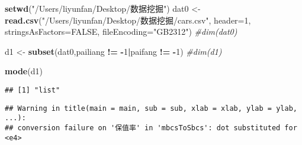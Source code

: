 \documentclass[]{article}
\newenvironment{Shaded}{\begin{snugshade}}{\end{snugshade}}
\newcommand{\KeywordTok}[1]{\textcolor[rgb]{0.13,0.29,0.53}{\textbf{#1}}}
\newcommand{\DataTypeTok}[1]{\textcolor[rgb]{0.13,0.29,0.53}{#1}}
\newcommand{\DecValTok}[1]{\textcolor[rgb]{0.00,0.00,0.81}{#1}}
\newcommand{\StringTok}[1]{\textcolor[rgb]{0.31,0.60,0.02}{#1}}
\newcommand{\CommentTok}[1]{\textcolor[rgb]{0.56,0.35,0.01}{\textit{#1}}}
\newcommand{\OtherTok}[1]{\textcolor[rgb]{0.56,0.35,0.01}{#1}}
\newcommand{\OperatorTok}[1]{\textcolor[rgb]{0.81,0.36,0.00}{\textbf{#1}}}
\newcommand{\NormalTok}[1]{#1}
\begin{document}
\begin{Shaded}
\begin{Highlighting}[]
\KeywordTok{setwd}\NormalTok{(}\StringTok{"/Users/liyunfan/Desktop/数据挖掘"}\NormalTok{)}
\NormalTok{dat0 <-}\StringTok{ }\KeywordTok{read.csv}\NormalTok{(}\StringTok{"/Users/liyunfan/Desktop/数据挖掘/cars.csv"}\NormalTok{, }\DataTypeTok{header=}\DecValTok{1}\NormalTok{, }\DataTypeTok{stringsAsFactors=}\OtherTok{FALSE}\NormalTok{, }\DataTypeTok{fileEncoding=}\StringTok{"GB2312"}\NormalTok{)}
\CommentTok{#dim(dat0)}
\end{Highlighting}
\end{Shaded}

\begin{Shaded}
\begin{Highlighting}[]
\NormalTok{d1 <-}\StringTok{ }\KeywordTok{subset}\NormalTok{(dat0,pailiang }\OperatorTok{!=}\StringTok{ }\OperatorTok{-}\DecValTok{1}\OperatorTok{|}\NormalTok{paifang }\OperatorTok{!=}\StringTok{ }\OperatorTok{-}\DecValTok{1}\NormalTok{)}
\CommentTok{#dim(d1)}
\end{Highlighting}
\end{Shaded}

\begin{Shaded}
\begin{Highlighting}[]
\KeywordTok{mode}\NormalTok{(d1)}
\end{Highlighting}
\end{Shaded}

\begin{verbatim}
## [1] "list"
\end{verbatim}

\begin{Shaded}
\end{Shaded}

\begin{verbatim}
## Warning in title(main = main, sub = sub, xlab = xlab, ylab = ylab, ...):
## conversion failure on '保值率' in 'mbcsToSbcs': dot substituted for <e4>
\end{verbatim}
\end{document}
